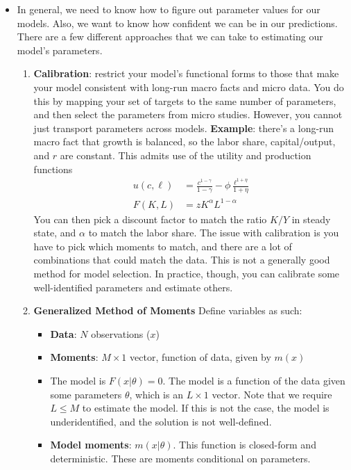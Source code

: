 \documentclass[12pt]{article}
\begin{document}
\begin{itemize}
    \item In general, we need to know how to figure out parameter values for our models. Also, we want to know how confident we can be in our predictions. There are a few different approaches that we can take to estimating our model's parameters.
    \begin{enumerate}
        \item \textbf{Calibration}: restrict your model's functional forms to those that make your model consistent with long-run macro facts and micro data. You do this by mapping your set of targets to the same number of parameters, and then select the parameters from micro studies. However, you cannot just transport parameters across models. \newline
        \newline \textbf{Example}: there's a long-run macro fact that growth is balanced, so the labor share, capital/output, and $r$ are constant. This admits use of the utility and production functions
        \[\begin{split}
            u(c,\ell) &= \frac{c^{1-\gamma}}{1-\gamma} - \phi \frac{\ell^{1+\eta}}{1+\eta} \\
            F(K,L) &= zK^{\alpha}L^{1-\alpha}
        \end{split}\]
        You can then pick a discount factor to match the ratio $K/Y$ in steady state, and $\alpha$ to match the labor share. The issue with calibration is you have to pick which moments to match, and there are a lot of combinations that could match the data. This is not a generally good method for model selection. In practice, though, you can calibrate some well-identified parameters and estimate others.
        \item \textbf{Generalized Method of Moments} Define variables as such:
        \begin{itemize}
            \item \textbf{Data}: $N$ observations ($x$)
            \item \textbf{Moments}: $M\times 1$ vector, function of data, given by $m(x)$
            \item The model is $F(x|\theta) = 0$. The model is a function of the data given some parameters $\theta$, which is an $L \times 1$ vector. Note that we require $L \leq M$ to estimate the model. If this is not the case, the model is underidentified, and the solution is not well-defined.
            \item \textbf{Model moments}: $m(x|\theta)$. This function is closed-form and deterministic. These are moments conditional on parameters.

\end{itemize}
\end{enumerate}
\end{itemize}
\end{document}
